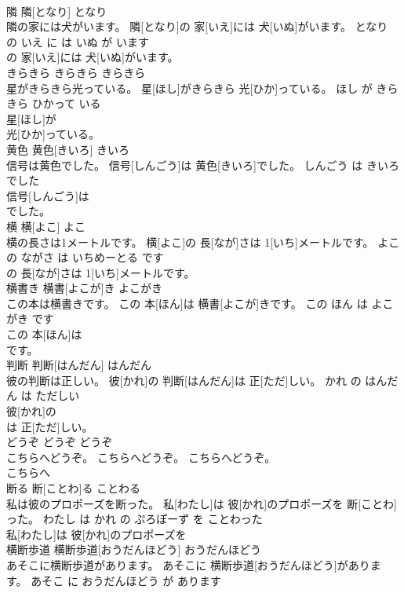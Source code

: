 \documentclass[8pt]{extreport}
\begin{document}
\begin{CJK}{UTF8}{min}
\\	隣	隣[となり]	となり	
\\	隣の家には犬がいます。	隣[となり]の 家[いえ]には 犬[いぬ]がいます。	となり の いえ に は いぬ が います	
\\	の 家[いえ]には 犬[いぬ]がいます。		
\\	きらきら	きらきら	きらきら	
\\	星がきらきら光っている。	星[ほし]がきらきら 光[ひか]っている。	ほし が きらきら ひかって いる	
\\	星[ほし]が
\\	光[ひか]っている。		
\\	黄色	黄色[きいろ]	きいろ	
\\	信号は黄色でした。	信号[しんごう]は 黄色[きいろ]でした。	しんごう は きいろ でした	
\\	信号[しんごう]は
\\	でした。		
\\	横	横[よこ]	よこ	
\\	横の長さは1メートルです。	横[よこ]の 長[なが]さは 1[いち]メートルです。	よこ の ながさ は いちめーとる です	
\\	の 長[なが]さは 1[いち]メートルです。		
\\	横書き	横書[よこが]き	よこがき	
\\	この本は横書きです。	この 本[ほん]は 横書[よこが]きです。	この ほん は よこがき です	
\\	この 本[ほん]は
\\	です。		
\\	判断	判断[はんだん]	はんだん	
\\	彼の判断は正しい。	彼[かれ]の 判断[はんだん]は 正[ただ]しい。	かれ の はんだん は ただしい	
\\	彼[かれ]の
\\	は 正[ただ]しい。		
\\	どうぞ	どうぞ	どうぞ	
\\	こちらへどうぞ。	こちらへどうぞ。	こちらへどうぞ。	
\\	こちらへ
\\	断る	断[ことわ]る	ことわる	
\\	私は彼のプロポーズを断った。	私[わたし]は 彼[かれ]のプロポーズを 断[ことわ]った。	わたし は かれ の ぷろぽーず を ことわった	
\\	私[わたし]は 彼[かれ]のプロポーズを
\\	横断歩道	横断歩道[おうだんほどう]	おうだんほどう	
\\	あそこに横断歩道があります。	あそこに 横断歩道[おうだんほどう]があります。	あそこ に おうだんほどう が あります	

\end{CJK}
\end{document}
